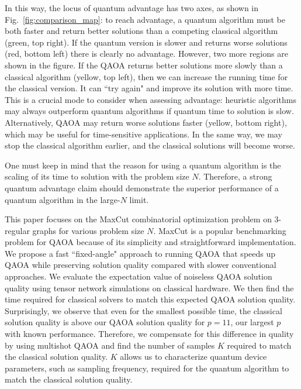 \documentclass[prb,reprint,nofootinbib,longbibliography,superscriptaddress]{revtex4-1}
\begin{document}
In this way, the locus of quantum advantage has two axes, as shown in Fig.~\ref{fig:comparison_map}: to reach advantage, a quantum algorithm must be both faster and return better solutions than a competing classical algorithm (green, top right). If the quantum version is slower and returns worse solutions (red, bottom left) there is clearly no advantage. However,  two more regions are shown in the figure. If the QAOA returns better solutions more slowly than a classical algorithm (yellow, top left), then we can increase the running time for the classical version. It can ``try again" and improve its solution with more time. This is a crucial mode  to consider when assessing advantage: heuristic algorithms may always outperform quantum algorithms if quantum time to solution is slow.
Alternatively, QAOA may return worse solutions faster (yellow, bottom right), which may be useful for time-sensitive applications.
In the same way, we may stop the classical algorithm earlier, and the classical solutions will become worse.

One must keep in mind that the reason for using a quantum algorithm is the scaling of its time to solution with the problem size $N$. 
Therefore, a strong quantum advantage claim should demonstrate the superior performance of a quantum algorithm in the large-$N$ limit.

This paper focuses on the MaxCut combinatorial optimization problem on 3-regular graphs for various problem size $N$. MaxCut is a popular benchmarking problem for QAOA because of its simplicity and straightforward implementation.
We propose a fast ``fixed-angle" approach to running QAOA that speeds up QAOA while preserving solution quality compared with slower conventional approaches.
We evaluate the expectation value of noiseless QAOA solution quality using tensor network simulations on classical hardware. We then find the time required for classical solvers to match this expected QAOA solution quality.
Surprisingly, we observe that even for the smallest possible time, the classical solution quality is above our QAOA solution quality for $p=11$, our largest $p$ with known performance.
Therefore, we compensate for this difference in quality by using multishot QAOA and find the number of samples $K$ required to match the classical solution quality.
$K$ allows us to characterize quantum device parameters, such as sampling frequency, required for the quantum algorithm to match the classical solution quality.
\end{document}
